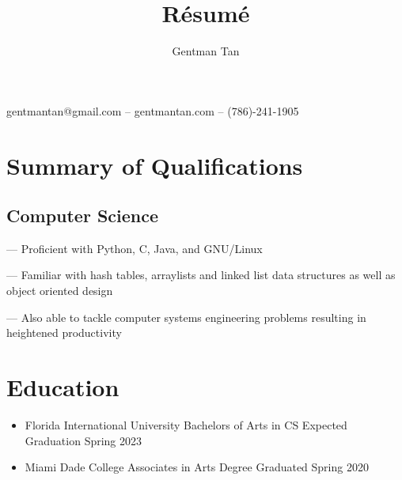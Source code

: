 \documentclass{article}
\makeatletter
\renewcommand{\maketitle}{
\begin{center}
{\huge\bfseries
\theauthor}

\vspace{.25em}
gentmantan@gmail.com --
gentmantan.com -- (786)-241-1905
\end{center}
}
\makeatother
\begin{document}
\title{R\'esum\'e}
\author{Gentman Tan}

\maketitle

\setlength{\parindent}{0cm}

\section{Summary of Qualifications}
%
%
%
%

\subsection{Computer Science}
--- Proficient with Python, C, Java, and GNU/Linux

--- Familiar with hash tables, arraylists and linked list data structures as well as object oriented design

--- Also able to tackle computer systems engineering problems resulting in heightened productivity

\section{Education}
\begin{itemize}
  \item Florida International University Bachelors of Arts in CS \hfill Expected Graduation Spring 2023
  \item Miami Dade College Associates in Arts Degree \hfill Graduated Spring 2020
\end{itemize}
\end{document}
